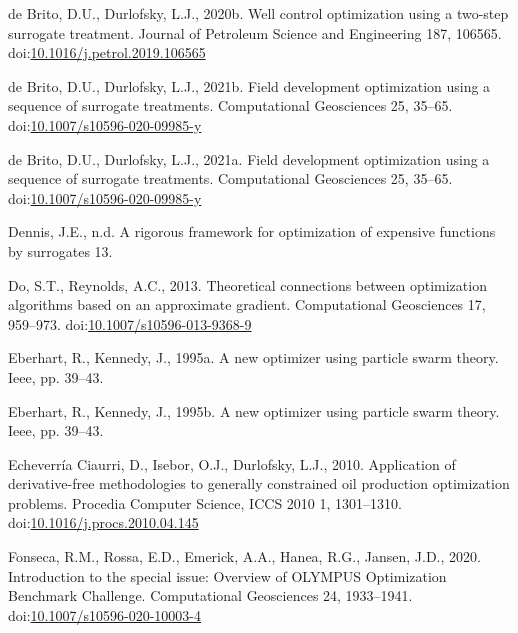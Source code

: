 \documentclass[]{elsarticle} %
\newlength{\cslhangindent}
\newenvironment{CSLReferences}[2] %
 {%
  \setlength{\parindent}{0pt}
  \ifodd #1 \everypar{\setlength{\hangindent}{\cslhangindent}}\ignorespaces\fi
  \ifnum #2 > 0
  \setlength{\parskip}{#2\baselineskip}
  \fi
 }%
 {}
\begin{document}
\begin{CSLReferences}{1}{0}
\leavevmode{}%
de Brito, D.U., Durlofsky, L.J., 2020b. Well control optimization using a two-step surrogate treatment. Journal of Petroleum Science and Engineering 187, 106565. doi:\href{https://doi.org/10.1016/j.petrol.2019.106565}{10.1016/j.petrol.2019.106565}

\leavevmode{}%
de Brito, D.U., Durlofsky, L.J., 2021b. Field development optimization using a sequence of surrogate treatments. Computational Geosciences 25, 35--65. doi:\href{https://doi.org/10.1007/s10596-020-09985-y}{10.1007/s10596-020-09985-y}

\leavevmode{}%
de Brito, D.U., Durlofsky, L.J., 2021a. Field development optimization using a sequence of surrogate treatments. Computational Geosciences 25, 35--65. doi:\href{https://doi.org/10.1007/s10596-020-09985-y}{10.1007/s10596-020-09985-y}

\leavevmode{}%
Dennis, J.E., n.d. A rigorous framework for optimization of expensive functions by surrogates 13.

\leavevmode{}%
Do, S.T., Reynolds, A.C., 2013. Theoretical connections between optimization algorithms based on an approximate gradient. Computational Geosciences 17, 959--973. doi:\href{https://doi.org/10.1007/s10596-013-9368-9}{10.1007/s10596-013-9368-9}

\leavevmode{}%
Eberhart, R., Kennedy, J., 1995a. A new optimizer using particle swarm theory. Ieee, pp. 39--43.

\leavevmode{}%
Eberhart, R., Kennedy, J., 1995b. A new optimizer using particle swarm theory. Ieee, pp. 39--43.

\leavevmode{}%
Echeverría Ciaurri, D., Isebor, O.J., Durlofsky, L.J., 2010. Application of derivative-free methodologies to generally constrained oil production optimization problems. Procedia Computer Science, ICCS 2010 1, 1301--1310. doi:\href{https://doi.org/10.1016/j.procs.2010.04.145}{10.1016/j.procs.2010.04.145}

\leavevmode{}%
Fonseca, R.M., Rossa, E.D., Emerick, A.A., Hanea, R.G., Jansen, J.D., 2020. Introduction to the special issue: Overview of OLYMPUS Optimization Benchmark Challenge. Computational Geosciences 24, 1933--1941. doi:\href{https://doi.org/10.1007/s10596-020-10003-4}{10.1007/s10596-020-10003-4}


\end{CSLReferences}
\end{document}

